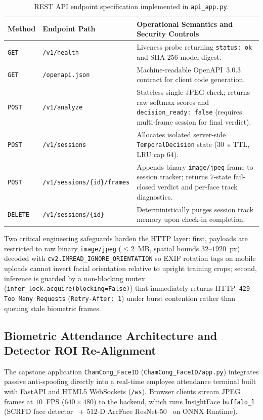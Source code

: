 \begin{table}[htbp]
\centering
\caption{REST API endpoint specification implemented in \texttt{api\_app.py}.}
\label{tab:api_endpoints}
\small
\begin{tabular}{L{1.6cm}L{4.8cm}L{7.7cm}}
\toprule
\textbf{Method} & \textbf{Endpoint Path} & \textbf{Operational Semantics and Security Controls} \\
\midrule
\texttt{GET} & \texttt{/v1/health} & Liveness probe returning \texttt{status: ok} and SHA-256 model digest. \\
\texttt{GET} & \texttt{/openapi.json} & Machine-readable OpenAPI~3.0.3 contract for client code generation. \\
\texttt{POST} & \texttt{/v1/analyze} & Stateless single-JPEG check; returns raw softmax scores and \texttt{decision\_ready: false} (requires multi-frame session for final verdict). \\
\texttt{POST} & \texttt{/v1/sessions} & Allocates isolated server-side \texttt{TemporalDecision} state ($30$~s TTL, LRU cap $64$). \\
\texttt{POST} & \texttt{/v1/sessions/\{id\}/frames} & Appends binary \texttt{image/jpeg} frame to session tracker; returns 7-state fail-closed verdict and per-face track diagnostics. \\
\texttt{DELETE} & \texttt{/v1/sessions/\{id\}} & Deterministically purges session track memory upon check-in completion. \\
\bottomrule
\end{tabular}
\end{table}

Two critical engineering safeguards harden the HTTP layer: first, payloads are restricted to raw binary \texttt{image/jpeg} ($\le 2$~MB, spatial bounds $32$--$1920$~px) decoded with \texttt{cv2.IMREAD\_IGNORE\_ORIENTATION} so EXIF rotation tags on mobile uploads cannot invert facial orientation relative to upright training crops; second, inference is guarded by a non-blocking mutex (\texttt{infer\_lock.acquire(blocking=False)}) that immediately returns HTTP~\texttt{429 Too Many Requests} (\texttt{Retry-After: 1}) under burst contention rather than queuing stale biometric frames.

\subsection{Biometric Attendance Architecture and Detector ROI Re-Alignment}

The capstone application \texttt{ChamCong\_FaceID} (\texttt{ChamCong\_FaceID/app.py}) integrates passive anti-spoofing directly into a real-time employee attendance terminal built with FastAPI and HTML5 WebSockets (\texttt{/ws}). Browser clients stream JPEG frames at $10$~FPS ($640\times480$) to the backend, which runs InsightFace \texttt{buffalo\_l} (SCRFD face detector~\cite{guo2022scrfd} + $512$-D ArcFace ResNet-50~\cite{deng2019arcface} on ONNX Runtime).

